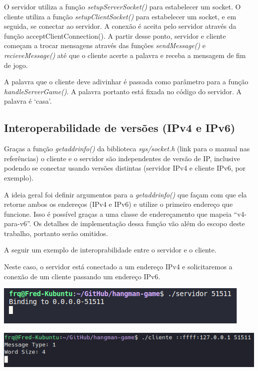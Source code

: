 \documentclass[12pt]{article}
\begin{document}
O servidor utiliza a função \emph{setupServerSocket()} para estabelecer um socket.
O cliente utiliza a função \emph{setupClientSocket()} para estabelecer um socket, e em seguida, se conectar ao servidor.
A conexão é aceita pelo servidor através da função \emph{}{acceptClientConnection()}.
A partir desse ponto, servidor e cliente começam a trocar mensagens através das funções \emph{sendMessage()} e \emph{recieveMessage()} até que o cliente acerte a palavra e receba a mensagem de fim de jogo. \par
A palavra que o cliente deve adivinhar é passada como parâmetro para a função \emph{handleServerGame()}.
A palavra portanto está fixada no código do servidor. A palavra é `casa'.


\subsection{Interoperabilidade de versões (IPv4 e IPv6)}
Graças a função \emph{getaddrinfo()} da biblioteca \emph{sys/socket.h} (link para o manual nas referências)
o cliente e o servidor são independentes de versão de IP, inclusive podendo se conectar usando versões distintas (servidor IPv4 e cliente IPv6, por exemplo). \par

A ideia geral foi definir argumentos para a \emph{getaddrinfo()} que façam com que ela retorne ambos os endereços (IPv4 e IPv6) e utilize o primeiro endereço que funcione.
Isso é possível graças a uma classe de endereçamento que mapeia ``v4-para-v6''. Os detalhes de implementação dessa função vão além do escopo deste trabalho, portanto serão omitidos. \par

A seguir um exemplo de interoprabilidade entre o servidor e o cliente. \par Neste caso, o servidor está conectado a um endereço IPv4 e solicitaremos a conexão de um cliente passando um endereço IPv6.

\begin{center}
    \includegraphics{Figura3.png}
\end{center}

\begin{center}
    \includegraphics{Figura4.png}
\end{center}
\end{document}
